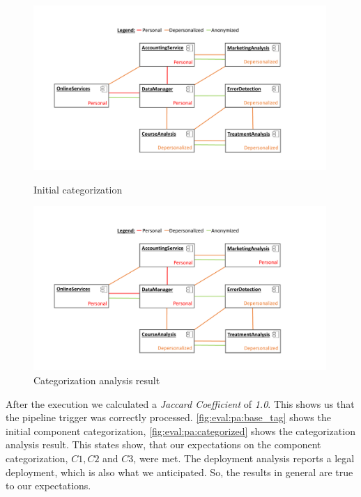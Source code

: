 \begin{figure}[h]
	\centering
	\begin{minipage}[b]{0.48\textwidth}		
		\includegraphics[trim = 20mm 10mm 40mm 10mm, clip, width=0.99\textwidth]{graphs/medSys_eval_pa_tagging_init}
		\caption{Initial categorization}
		\label{fig:eval:pa:base_tag}
	\end{minipage}
	\begin{minipage}[b]{0.48\textwidth}
		\includegraphics[trim = 20mm 10mm 40mm 10mm, clip, width=0.99\textwidth]{graphs/medSys_eval_pa_tagging_analysis}
		\caption{Categorization analysis result}
		\label{fig:eval:pa:categorized}
	\end{minipage}
\end{figure}

After the execution we calculated a \textit{Jaccard Coefficient} of \textit{1.0}. This shows us that the pipeline trigger was correctly processed. \autoref{fig:eval:pa:base_tag} shows the initial component categorization, \autoref{fig:eval:pa:categorized} shows the categorization analysis result. This states show, that our expectations on the component categorization, $C1, C2$ and $C3$, were met. The deployment analysis reports a legal deployment, which is also what we anticipated. So, the results in general are true to our expectations.

